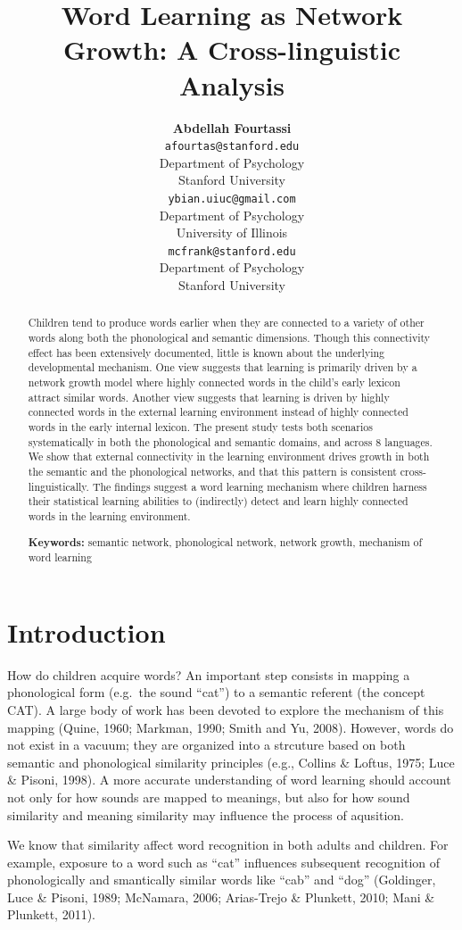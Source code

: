 \documentclass[10pt, letterpaper]{article}
\title{Word Learning as Network Growth: A Cross-linguistic Analysis}
\author{{\large \bf Abdellah Fourtassi} \\ \texttt{afourtas@stanford.edu} \\ Department of Psychology \\ Stanford University \And {\large \bf Yuan Bian} \\ \texttt{ybian.uiuc@gmail.com} \\ Department of Psychology \\ University of Illinois \And {\large \bf Michael C. Frank} \\ \texttt{mcfrank@stanford.edu} \\ Department of Psychology \\ Stanford University}
\begin{document}
\maketitle

\begin{abstract}
Children tend to produce words earlier when they are connected to a
variety of other words along both the phonological and semantic
dimensions. Though this connectivity effect has been extensively
documented, little is known about the underlying developmental
mechanism. One view suggests that learning is primarily driven by a
network growth model where highly connected words in the child's early
lexicon attract similar words. Another view suggests that learning is
driven by highly connected words in the external learning environment
instead of highly connected words in the early internal lexicon. The
present study tests both scenarios systematically in both the
phonological and semantic domains, and across 8 languages. We show that
external connectivity in the learning environment drives growth in both
the semantic and the phonological networks, and that this pattern is
consistent cross-linguistically. The findings suggest a word learning
mechanism where children harness their statistical learning abilities to
(indirectly) detect and learn highly connected words in the learning
environment.

\textbf{Keywords:}
semantic network, phonological network, network growth, mechanism of
word learning
\end{abstract}

\section{Introduction}\label{introduction}

How do children acquire words? An important step consists in mapping a
phonological form (e.g.~the sound ``cat'') to a semantic referent (the
concept CAT). A large body of work has been devoted to explore the
mechanism of this mapping (Quine, 1960; Markman, 1990; Smith and Yu,
2008). However, words do not exist in a vacuum; they are organized into
a strcuture based on both semantic and phonological similarity
principles (e.g., Collins \& Loftus, 1975; Luce \& Pisoni, 1998). A more
accurate understanding of word learning should account not only for how
sounds are mapped to meanings, but also for how sound similarity and
meaning similarity may influence the process of aqusition.

We know that similarity affect word recognition in both adults and
children. For example, exposure to a word such as ``cat'' influences
subsequent recognition of phonologically and smantically similar words
like ``cab'' and ``dog'' (Goldinger, Luce \& Pisoni, 1989; McNamara,
2006; Arias-Trejo \& Plunkett, 2010; Mani \& Plunkett, 2011).
\end{document}

